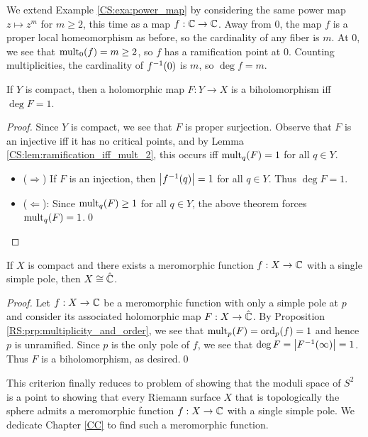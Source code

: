 \documentclass[../Moduli_Spaces_of_Riemann_Surfaces.tex]{subfiles}
\begin{document}
    \begin{example}
        We extend Example \ref{CS:exa:power_map} by considering the same power map $z\mapsto z^m$ for $m\geq2$, this time as a map $f:\mathbb{C}\to\mathbb{C}$. Away from $0$, the map $f$ is a proper local homeomorphism as before, so the cardinality of any fiber is $m$. At $0$, we see that $\operatorname{mult}_0\!\left(f\right)=m\geq2$, so $f$ has a ramification point at $0$. Counting multiplicities, the cardinality of $f^{-1}\!\left(0\right)$ is $m$, so $\deg f=m$.\exqed
    \end{example}
    \begin{corollary}
        If $Y$ is compact, then a holomorphic map $F:Y\to X$ is a biholomorphism iff $\deg F=1$.
    \end{corollary}
    \begin{proof}
        Since $Y$ is compact, we see that $F$ is proper surjection. Observe that $F$ is an injective iff it has no critical points, and by Lemma \ref{CS:lem:ramification_iff_mult_2}, this occurs iff $\operatorname{mult}_q\!\left(F\right)=1$ for all $q\in Y$.
        \begin{itemize}
            \item ($\Rightarrow$) If $F$ is an injection, then $\left|f^{-1}\!\left(q\right)\right|=1$ for all $q\in Y$. Thus $\deg F=1$.
                \vspace{-0.05in}
            \item ($\Leftarrow$): Since $\operatorname{mult}_q\!\left(F\right)\geq1$ for all $q\in Y$, the above theorem forces $\operatorname{mult}_q\!\left(F\right)=1$.\qed
        \end{itemize}
    \end{proof}
    \begin{corollary}\label{CS:cor:exists_meromorphic_implies_biholomorphic_Riemann_sphere}
        If $X$ is compact and there exists a meromorphic function $f:X\to\mathbb{C}$ with a single simple pole, then $X\cong\hat{\mathbb{C}}$.
    \end{corollary}
    \begin{proof}
        Let $f:X\to\mathbb{C}$ be a meromorphic function with only a simple pole at $p$ and consider its associated holomorphic map $F:X\to\hat{\mathbb{C}}$. By Proposition \ref{RS:prp:multiplicity_and_order}, we see that $\operatorname{mult}_p\!\left(F\right)=\operatorname{ord}_p\!\left(f\right)=1$ and hence $p$ is unramified. Since $p$ is the only pole of $f$, we see that $\deg F=\left|F^{-1}\!\left(\infty\right)\right|=1$. Thus $F$ is a biholomorphism, as desired.\qed
    \end{proof}
    \begin{remark}
        This criterion finally reduces to problem of showing that the moduli space of $S^2$ is a point to showing that every Riemann surface $X$ that is topologically the sphere admits a meromorphic function $f:X\to\mathbb{C}$ with a single simple pole. We dedicate Chapter \ref{CC} to find such a meromorphic function.\exqed
    \end{remark}
\end{document}
